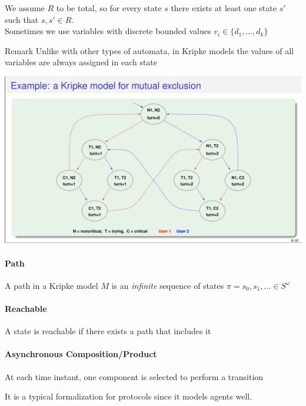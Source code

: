 \documentclass{article}
\begin{document}
We assume $R$ to be total, so for every state $s$ there exists at least one state $s'$ such that $s,s'\in R$.\\
Sometimes we use variables with discrete bounded values $v_i\in\{d_1,\dots,d_k\}$

\begin{callout}{Remark}
    Unlike with other types of automata, in Kripke models the values of all variables are always assigned in each state
\end{callout}

\begin{center}
    \includegraphics[width=1\linewidth]{images/kripke_example.png}
\end{center}

\paragraph{Path} A path in a Kripke model $M$ is an \textit{infinite} sequence of states $\pi = s_0, s_1, \dots \in S^\omega$

\paragraph{Reachable} A state is reachable if there exists a path that includes it

\paragraph{Asynchronous Composition/Product} At each time instant, one component is selected to perform a transition

It is a typical formalization for protocols since it models agents well.
\end{document}

